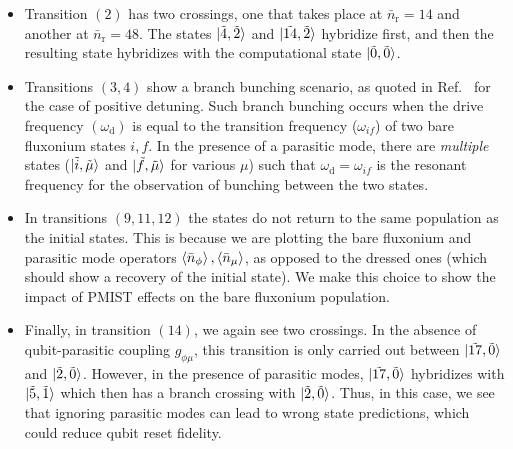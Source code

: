 \documentclass[%
reprint,
superscriptaddress,
 amsmath,amssymb,
 aps,
 prx,
longbibliography,
floatfix,
]{revtex4-2}
\begin{document}
\begin{itemize}
    \item Transition $(2)$ has two crossings, one that takes place at $\bar n_\textrm{r}=14$ and another at $\bar n_\textrm{r}=48$. The states $\ket{\tilde{4},\tilde{2}}$ and $\ket{\tilde{14},\tilde{2}}$ hybridize first, and then the resulting state hybridizes with the computational state $\ket{\tilde{0},\tilde{0}}$.
    \item Transitions $(3,4)$ show a branch bunching scenario, as quoted in Ref.~\cite{dumas2024unified} for the case of positive detuning. Such branch bunching occurs when the drive frequency $(\omega_\textrm{d})$ is equal to the transition frequency ($\omega_{if}$) of two bare fluxonium states $i,f$. In the presence of a parasitic mode, there are \emph{multiple} states ($\ket{\tilde{i},\tilde{\mu}}$ and $\ket{\tilde{f},\tilde{\mu}}$ for various $\mu$) such that $\omega_\textrm{d}=\omega_{if}$ is the resonant frequency for the observation of bunching between the two states.
    \item In transitions $(9,11,12)$ the states do not return to the same population as the initial states. This is because we are plotting the bare fluxonium and parasitic mode operators $\braket{\bar n_\phi},\braket{\bar n_\mu}$, as opposed to the dressed ones (which should show a recovery of the initial state). We make this choice to show the impact of PMIST effects on the bare fluxonium population.
    \item Finally, in transition $(14)$, we again see two crossings. In the absence of qubit-parasitic coupling $g_{\phi\mu}$, this transition is only carried out between $\ket{\tilde{17},\tilde{0}}$ and $\ket{\tilde{2},\tilde{0}}$. However, in the presence of parasitic modes, $\ket{\tilde{17},\tilde{0}}$ hybridizes with $\ket{\tilde{5},\tilde{1}}$ which then has a branch crossing with $\ket{\tilde{2},\tilde{0}}$. Thus, in this case, we see that ignoring parasitic modes can lead to wrong state predictions, which could reduce qubit reset fidelity.
\end{itemize}
\end{document}
